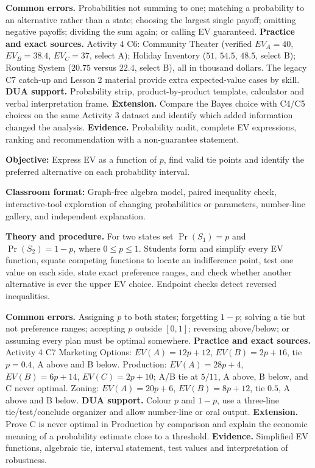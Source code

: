 \documentclass[10pt,letterpaper]{article}
\newcommand{\labelled}[2]{\textbf{#1:} #2\par}
\newcommand{\partheading}[1]{\Needspace{6\baselineskip}\par\vspace{5pt}{\bfseries #1\par}\vspace{1pt}}
\begin{document}
\begin{bluebox}
		\textbf{Common errors.} Probabilities not summing to one; matching a probability
		to an alternative rather than a state; choosing the largest single payoff;
		omitting negative payoffs; dividing the sum again; or calling EV guaranteed.
		\textbf{Practice and exact sources.} Activity 4 C6: Community Theater
		(verified $EV_A=40$, $EV_B=38.4$, $EV_C=37$, select A); Holiday Inventory
		($51$, $54.5$, $48.5$, select B); Routing System ($20.75$ versus $22.4$,
		select B), all in thousand dollars. The legacy C7 catch-up and Lesson 2 material
		provide extra expected-value cases by skill. \textbf{DUA support.} Probability
		strip, product-by-product template, calculator and verbal interpretation frame.
		\textbf{Extension.} Compare the Bayes choice with C4/C5 choices on the same
		Activity 3 dataset and identify which added information changed the analysis.
		\textbf{Evidence.} Probability audit, complete EV expressions, ranking and
		recommendation with a non-guarantee statement.
		
		\partheading{Part 3---C7: Probability Sensitivity}
		\labelled{Objective}{Express EV as a function of $p$, find valid tie points and identify the preferred alternative on each probability interval.}
		\labelled{Classroom format}{Graph-free algebra model, paired inequality check, interactive-tool exploration of changing probabilities or parameters, number-line gallery, and independent explanation.}
		\textbf{Theory and procedure.} For two states set $\Pr(S_1)=p$ and
		$\Pr(S_2)=1-p$, where $0\leq p\leq1$. Students form and simplify every EV
		function, equate competing functions to locate an indifference point, test one
		value on each side, state exact preference ranges, and check whether another
		alternative is ever the upper EV choice. Endpoint checks detect reversed
		inequalities.
		
		\textbf{Common errors.} Assigning $p$ to both states; forgetting $1-p$;
		solving a tie but not preference ranges; accepting $p$ outside $[0,1]$;
		reversing above/below; or assuming every plan must be optimal somewhere.
		\textbf{Practice and exact sources.} Activity 4 C7 Marketing Options:
		$EV(A)=12p+12$, $EV(B)=2p+16$, tie $p=0.4$, A above and B below. Production:
		$EV(A)=28p+4$, $EV(B)=6p+14$, $EV(C)=2p+10$; A/B tie at $5/11$, A above, B
		below, and C never optimal. Zoning: $EV(A)=20p+6$, $EV(B)=8p+12$, tie $0.5$,
		A above and B below. \textbf{DUA support.} Colour $p$ and $1-p$, use a
		three-line tie/test/conclude organizer and allow number-line or oral output.
		\textbf{Extension.} Prove C is never optimal in Production by comparison and
		explain the economic meaning of a probability estimate close to a threshold.
		\textbf{Evidence.} Simplified EV functions, algebraic tie, interval statement,
		test values and interpretation of robustness.
		

\end{bluebox}
\end{document}
